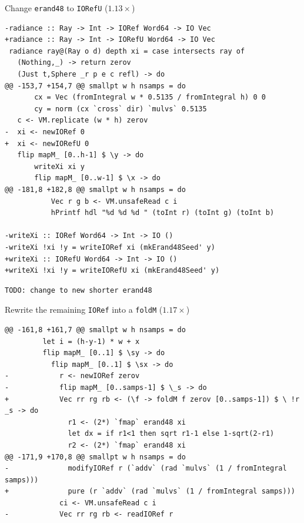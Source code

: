 \documentclass[8pt]{beamer}
\begin{document}
\begin{frame}[fragile]{Change \texttt{erand48} to \texttt{IORefU} ($1.13\times$)}

\begin{verbatim}
-radiance :: Ray -> Int -> IORef Word64 -> IO Vec
+radiance :: Ray -> Int -> IORefU Word64 -> IO Vec
 radiance ray@(Ray o d) depth xi = case intersects ray of
   (Nothing,_) -> return zerov
   (Just t,Sphere _r p e c refl) -> do
@@ -153,7 +154,7 @@ smallpt w h nsamps = do
       cx = Vec (fromIntegral w * 0.5135 / fromIntegral h) 0 0
       cy = norm (cx `cross` dir) `mulvs` 0.5135
   c <- VM.replicate (w * h) zerov
-  xi <- newIORef 0
+  xi <- newIORefU 0
   flip mapM_ [0..h-1] $ \y -> do
       writeXi xi y
       flip mapM_ [0..w-1] $ \x -> do
@@ -181,8 +182,8 @@ smallpt w h nsamps = do
           Vec r g b <- VM.unsafeRead c i
           hPrintf hdl "%d %d %d " (toInt r) (toInt g) (toInt b)
 
-writeXi :: IORef Word64 -> Int -> IO ()
-writeXi !xi !y = writeIORef xi (mkErand48Seed' y)
+writeXi :: IORefU Word64 -> Int -> IO ()
+writeXi !xi !y = writeIORefU xi (mkErand48Seed' y)
\end{verbatim}
\begin{verbatim}
TODO: change to new shorter erand48
\end{verbatim}
\end{frame}



\begin{frame}[fragile]{Rewrite the remaining \texttt{IORef} into a \texttt{foldM} ($1.17\times$) }
\begin{verbatim}
@@ -161,8 +161,7 @@ smallpt w h nsamps = do
         let i = (h-y-1) * w + x
         flip mapM_ [0..1] $ \sy -> do
           flip mapM_ [0..1] $ \sx -> do
-            r <- newIORef zerov
-            flip mapM_ [0..samps-1] $ \_s -> do
+            Vec rr rg rb <- (\f -> foldM f zerov [0..samps-1]) $ \ !r _s -> do
               r1 <- (2*) `fmap` erand48 xi
               let dx = if r1<1 then sqrt r1-1 else 1-sqrt(2-r1)
               r2 <- (2*) `fmap` erand48 xi
@@ -171,9 +170,8 @@ smallpt w h nsamps = do
-              modifyIORef r (`addv` (rad `mulvs` (1 / fromIntegral samps)))
+              pure (r `addv` (rad `mulvs` (1 / fromIntegral samps)))
             ci <- VM.unsafeRead c i
-            Vec rr rg rb <- readIORef r
\end{verbatim}
\end{frame}
\end{document}
